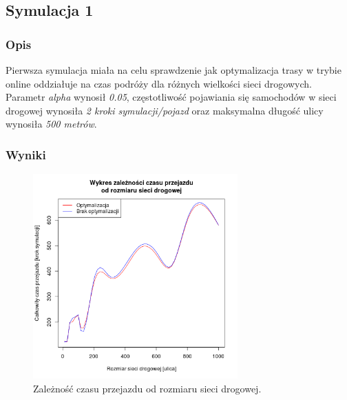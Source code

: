 \documentclass[11pt,a4paper]{article}
\begin{document}
\subsection{Symulacja 1}

\subsubsection{Opis}

Pierwsza symulacja miała na celu sprawdzenie jak optymalizacja trasy w trybie online oddziałuje na czas podróży dla różnych wielkości sieci drogowych. Parametr \textit{alpha} wynosił \emph{0.05}, częstotliwość pojawiania się samochodów w sieci drogowej wynosiła \emph{2 kroki symulacji/pojazd} oraz maksymalna długość ulicy wynosiła \emph{500 metrów}.

\subsubsection{Wyniki}



\begin{figure}[H]
	\centering
		\includegraphics[width=0.7\textwidth]{../images/simulation1}
	\caption{Zależność czasu przejazdu od rozmiaru sieci drogowej.}
\end{figure}
\end{document}
